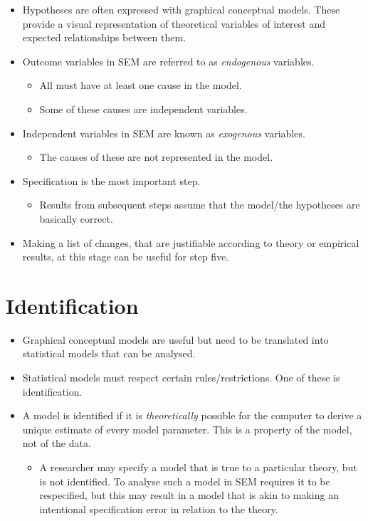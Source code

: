 \documentclass[
  a4paper,
  DIV=11,
  numbers=noendperiod]{scrreprt}
\providecommand{\tightlist}{%
  \setlength{\itemsep}{0pt}\setlength{\parskip}{0pt}}\usepackage{longtable,booktabs,array}
\begin{document}
\begin{itemize}
\tightlist
\item
  Hypotheses are often expressed with graphical conceptual models. These
  provide a visual representation of theoretical variables of interest
  and expected relationships between them.
\item
  Outcome variables in SEM are referred to as \emph{endogenous}
  variables.

  \begin{itemize}
  \tightlist
  \item
    All must have at least one cause in the model.
  \item
    Some of these causes are independent variables.
  \end{itemize}
\item
  Independent variables in SEM are known as \emph{exogenous} variables.

  \begin{itemize}
  \tightlist
  \item
    The causes of these are not represented in the model.
  \end{itemize}
\item
  Specification is the most important step.

  \begin{itemize}
  \tightlist
  \item
    Results from subsequent steps assume that the model/the hypotheses
    are basically correct.
  \end{itemize}
\item
  Making a list of changes, that are justifiable according to theory or
  empirical results, at this stage can be useful for step five.
\end{itemize}

\section{Identification}\label{identification}

\begin{itemize}
\tightlist
\item
  Graphical conceptual models are useful but need to be translated into
  statistical models that can be analysed.
\item
  Statistical models must respect certain rules/restrictions. One of
  these is identification.
\item
  A model is identified if it is \emph{theoretically} possible for the
  computer to derive a unique estimate of every model parameter. This is
  a property of the model, not of the data.

  \begin{itemize}
  \tightlist
  \item
    A researcher may specify a model that is true to a particular
    theory, but is not identified. To analyse such a model in SEM
    requires it to be respecified, but this may result in a model that
    is akin to making an intentional specification error in relation to
    the theory.
  \end{itemize}
\end{itemize}
\end{document}
